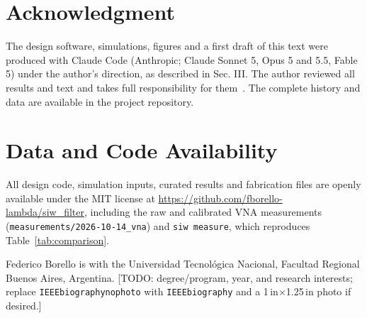 \documentclass{ieeeaccess}
\begin{document}
\section*{Acknowledgment}
The design software, simulations, figures and a first draft of this text
were produced with Claude Code (Anthropic; Claude Sonnet 5, Opus 5 and 5.5,
Fable 5) under the author's direction, as described in Sec. III. The author
reviewed all results and text and takes full responsibility for them~\cite{ieee_ai_policy}. The complete history and data are available in the
project repository.



\section*{Data and Code Availability}
All design code, simulation inputs, curated results and fabrication files are
openly available under the MIT license at
\url{https://github.com/fborello-lambda/siw_filter}, including the raw and calibrated
VNA measurements (\texttt{measurements/2026-10-14\_vna}) and \texttt{siw measure}, which reproduces
Table~\ref{tab:comparison}.




\begin{IEEEbiographynophoto}{Federico Borello}
is with the Universidad Tecnol\'ogica Nacional, Facultad Regional Buenos Aires,
Argentina. [TODO: degree/program, year, and research interests; replace
\texttt{IEEEbiographynophoto} with \texttt{IEEEbiography} and a
1\,in$\times$1.25\,in photo if desired.]
\end{IEEEbiographynophoto}

\EOD
\end{document}
